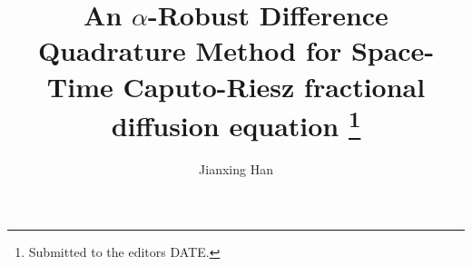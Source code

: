

\usepackage{lipsum}
\usepackage{amsfonts}
\usepackage{graphicx}
\usepackage{epstopdf}
\usepackage{algorithmic}
\usepackage{amsmath, amssymb}
\ifpdf
\else
\fi

\newcommand{\creflastconjunction}{, and~}



\title{An $\alpha$-Robust Difference Quadrature Method for Space-Time Caputo-Riesz fractional diffusion equation \thanks{Submitted to the editors DATE.
}}

\author{Jianxing Han}%

\usepackage{amsopn}
\DeclareMathOperator{\diag}{diag}


